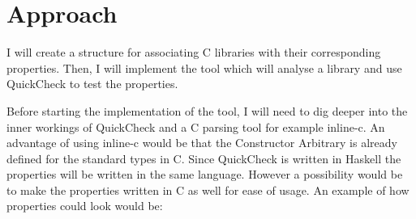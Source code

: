 \section{Approach}




I will create a structure for associating C libraries with their corresponding properties.
Then, I will implement the tool which will analyse a library and use QuickCheck to test the properties.

Before starting the implementation of the tool, I will need to dig deeper into the inner workings of QuickCheck and a C parsing tool for example inline-c.
An advantage of using inline-c would be that the Constructor Arbitrary is already defined for the standard types in C.
Since QuickCheck is written in Haskell the properties will be written in the same language.
However a possibility would be to make the properties written in C as well for ease of usage.
An example of how properties could look would be:

